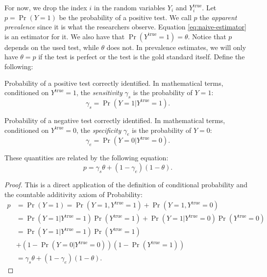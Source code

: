 For now, we drop the index $i$ in the random variables $Y_i$ and
$Y_i^{\mathrm{true}}$. Let $p = \Pr(Y = 1)$ be the probability of a positive test.
We call $p$ the {\em apparent prevalence} since it is what the researchers 
observe. Equation \eqref{eq:naive-estimator} is an estimator for it. 
We also have that $\Pr(Y^{\mathrm{true}} = 1) = \theta$. Notice that $p$
depends on the used test, while $\theta$ does not. In prevalence estimates, we 
will only have $\theta = p$ if the test is perfect or the test is the 
gold standard itself. Define the following: 

\begin{definition}[Sensitivity]
  Probability of a positive test correctly identified. In mathematical terms,
  conditioned on $Y^{\mathrm{true}} = 1$, the {\em sensitivity} $\gamma_s$ is 
  the probability of $Y = 1$: 
  \begin{equation}
    \gamma_s = \Pr(Y = 1|Y^{\mathrm{true}} = 1). 
  \end{equation} 
\end{definition}

\begin{definition}[Specificity]
  Probability of a negative test correctly identified. In mathematical terms,
  conditioned on $Y^{\mathrm{true}} = 0$, the {\em specificity} $\gamma_e$ is 
  the probability of $Y = 0$: 
  \begin{equation}
    \gamma_e = \Pr(Y = 0|Y^{\mathrm{true}} = 0). 
  \end{equation} 
\end{definition}

\begin{theorem} These quantities are related by the following equation:
  \begin{equation}
    \label{eq:apparent-true-prevalence}
    p = \gamma_s\theta + (1-\gamma_e)(1-\theta).
  \end{equation}
  
\end{theorem}

\begin{proof}
  This is a direct application of the definition of conditional probability
  and the countable additivity axiom of Probability:
  \begin{equation*}
    \begin{split}
      p &= \Pr(Y = 1) = \Pr(Y = 1, Y^{\mathrm{true}} = 1) + \Pr(Y = 1, Y^{\mathrm{true}} = 0) \\
      &= \Pr(Y=1|Y^{\mathrm{true}}=1)\Pr(Y^{\mathrm{true}}=1) + \Pr(Y=1|Y^{\mathrm{true}}=0)\Pr(Y^{\mathrm{true}}=0) \\
      &= \Pr(Y=1|Y^{\mathrm{true}}=1)\Pr(Y^{\mathrm{true}}=1) \\ 
      &+ (1 - \Pr(Y=0|Y^{\mathrm{true}}=0))(1-\Pr(Y^{\mathrm{true}}=1)) \\
      &= \gamma_s\theta + (1 - \gamma_e)(1-\theta).
    \end{split}
  \end{equation*} 
\end{proof}

